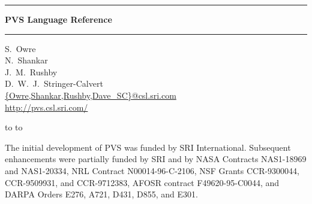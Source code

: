 \documentclass[12pt]{book}
\begin{document}
\begin{titlepage}
\renewcommand{\thepage}{title}
\vspace*{1in}
\noindent
\rule[1pt]{\textwidth}{2pt}
\begin{center}
\textbf{\pvstitle PVS Language Reference}
\end{center}
\rule[1in]{\textwidth}{2pt}
\vspace*{2in}
\begin{flushleft}
S.~Owre\\
N.~Shankar\\
J.~M.~Rushby\\
D.~W.~J.~Stringer-Calvert\\
{\smaller\url{{Owre,Shankar,Rushby,Dave_SC}@csl.sri.com}}\\
{\smaller\url{http://pvs.csl.sri.com/}}
\end{flushleft}
\vspace*{1in}
\vbox{\hbox to %
\hbox to }
\end{titlepage}

\renewcommand{\chaptermark}[1]{\markboth{{\em #1}}{}\markright{{\em #1}}}
\renewcommand{\sectionmark}[1]{\markright{\thesection \em \ #1}}
\thispagestyle{empty}

\newpage
\renewcommand{\thepage}{ack}
\vspace*{6in}\noindent
The initial development of PVS was funded by SRI International.
Subsequent enhancements were partially funded by SRI and by NASA
Contracts NAS1-18969 and NAS1-20334, NRL Contract N00014-96-C-2106,
NSF Grants CCR-9300044, CCR-9509931, and CCR-9712383, AFOSR contract
F49620-95-C0044, and DARPA Orders E276, A721, D431, D855, and E301.
\newpage
{}
\setcounter{page}{1}

\tableofcontents

\end{document}
